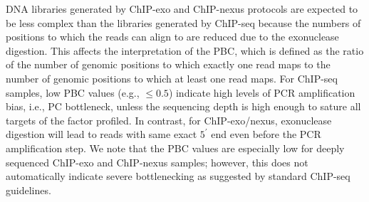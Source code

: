 \documentclass{bmcart}
\begin{document}
DNA libraries generated by ChIP-exo and ChIP-nexus protocols are
expected to be less complex than the libraries generated by ChIP-seq because
 the numbers of positions to which the reads can 
align to are reduced  due to the exonuclease digestion. 
This affects the interpretation of the PBC, which is defined as the ratio of the 
number of genomic positions to which exactly one read maps to   the number of genomic positions to which at least one  read maps.
For ChIP-seq samples,  low PBC values (e.g., $\le 0.5$) indicate high levels of PCR amplification bias, i.e., PC bottleneck, 
 unless the sequencing depth is high enough to sature all targets of the factor profiled.
In contrast,  for ChIP-exo/nexus, exonuclease digestion will lead to reads with same exact 
$5^{\prime}$ end even before the PCR amplification step.
We note  that  the PBC values are especially low
for deeply sequenced ChIP-exo and ChIP-nexus
samples; however, this does not automatically indicate severe 
bottlenecking as suggested by standard ChIP-seq guidelines.
\end{document}
